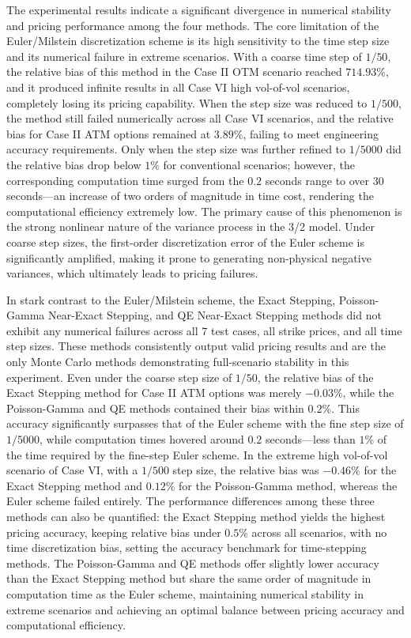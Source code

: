 The experimental results indicate a significant divergence in numerical stability and pricing performance among the four methods. The core limitation of the Euler/Milstein discretization scheme is its high sensitivity to the time step size and its numerical failure in extreme scenarios. With a coarse time step of $1/50$, the relative bias of this method in the Case II OTM scenario reached $714.93\%$, and it produced infinite results in all Case VI high vol-of-vol scenarios, completely losing its pricing capability. When the step size was reduced to $1/500$, the method still failed numerically across all Case VI scenarios, and the relative bias for Case II ATM options remained at $3.89\%$, failing to meet engineering accuracy requirements. Only when the step size was further refined to $1/5000$ did the relative bias drop below $1\%$ for conventional scenarios; however, the corresponding computation time surged from the $0.2$ seconds range to over $30$ seconds—an increase of two orders of magnitude in time cost, rendering the computational efficiency extremely low. The primary cause of this phenomenon is the strong nonlinear nature of the variance process in the 3/2 model. Under coarse step sizes, the first-order discretization error of the Euler scheme is significantly amplified, making it prone to generating non-physical negative variances, which ultimately leads to pricing failures.

In stark contrast to the Euler/Milstein scheme, the Exact Stepping, Poisson-Gamma Near-Exact Stepping, and QE Near-Exact Stepping methods did not exhibit any numerical failures across all 7 test cases, all strike prices, and all time step sizes. These methods consistently output valid pricing results and are the only Monte Carlo methods demonstrating full-scenario stability in this experiment. Even under the coarse step size of $1/50$, the relative bias of the Exact Stepping method for Case II ATM options was merely $-0.03\%$, while the Poisson-Gamma and QE methods contained their bias within $0.2\%$. This accuracy significantly surpasses that of the Euler scheme with the fine step size of $1/5000$, while computation times hovered around $0.2$ seconds—less than $1\%$ of the time required by the fine-step Euler scheme. In the extreme high vol-of-vol scenario of Case VI, with a $1/500$ step size, the relative bias was $-0.46\%$ for the Exact Stepping method and $0.12\%$ for the Poisson-Gamma method, whereas the Euler scheme failed entirely. The performance differences among these three methods can also be quantified: the Exact Stepping method yields the highest pricing accuracy, keeping relative bias under $0.5\%$ across all scenarios, with no time discretization bias, setting the accuracy benchmark for time-stepping methods. The Poisson-Gamma and QE methods offer slightly lower accuracy than the Exact Stepping method but share the same order of magnitude in computation time as the Euler scheme, maintaining numerical stability in extreme scenarios and achieving an optimal balance between pricing accuracy and computational efficiency.

